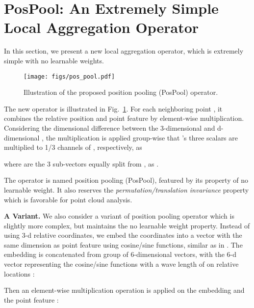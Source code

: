 \documentclass[runningheads]{llncs}
\begin{document}
\section{PosPool: An Extremely Simple Local Aggregation Operator}

In this section, we present a new local aggregation operator, which is extremely simple with no learnable weights.

\begin{figure}[t]
\begin{center}
   \texttt{[image: figs/pos\_pool.pdf]}
\end{center}
   \vspace{-2em}
   \caption{Illustration of the proposed position pooling (PosPool) operator.}
   \vspace{-1em}
\label{fig:pos_pool}
\end{figure}

The new operator is illustrated in Fig.~\ref{fig:pos_pool}. For each neighboring point , it combines the relative position  and point feature  by element-wise multiplication. Considering the dimensional difference between the 3-dimensional  and d-dimensional , the multiplication is applied group-wise that 's three scalars  are multiplied to 1/3 channels of , respectively, as

where  are the 3 sub-vectors equally split from , as .

The operator is named position pooling (PosPool), featured by its property of no learnable weight. It also reserves the \emph{permutation/translation invariance} property which is favorable for point cloud analysis.

\vspace{0.3em} \noindent \textbf{A Variant.} We also consider a variant of position pooling operator which is slightly more complex, but maintains the no learnable weight property. Instead of using 3-d relative coordinates, we embed the coordinates into a vector with the same dimension as point feature  using cosine/sine functions, similar as in \cite{vaswani2017attention}. The embedding is concatenated from  group of 6-dimensional vectors, with the  6-d vector representing the cosine/sine functions with a wave length of  on relative locations :
\begin{small}

\end{small}

Then an element-wise multiplication operation is applied on the embedding  and the point feature :
\end{document}
